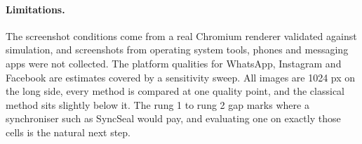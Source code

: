 \documentclass[10pt,twocolumn]{article}
\begin{document}
\paragraph{Limitations.}
The screenshot conditions come from a real Chromium renderer validated against simulation, and screenshots from operating system tools, phones and messaging apps were not collected. The platform qualities for WhatsApp, Instagram and Facebook are estimates covered by a sensitivity sweep. All images are 1024 px on the long side, every method is compared at one quality point, and the classical method sits slightly below it. The rung 1 to rung 2 gap marks where a synchroniser such as SyncSeal \cite{fernandez2025syncseal} would pay, and evaluating one on exactly those cells is the natural next step.


\scriptsize
\end{document}
